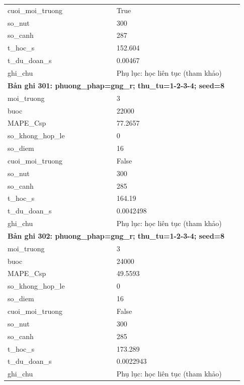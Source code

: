 \begin{longtable}{p{0.43\linewidth}p{0.50\linewidth}}
cuoi\_\allowbreak moi\_\allowbreak truong & True \\
so\_\allowbreak nut & 300 \\
so\_\allowbreak canh & 287 \\
t\_\allowbreak hoc\_\allowbreak s & 152.604 \\
t\_\allowbreak du\_\allowbreak doan\_\allowbreak s & 0.00467 \\
ghi\_\allowbreak chu & Phụ lục: học liên tục (tham khảo) \\
\midrule
\multicolumn{2}{p{0.95\linewidth}}{\textbf{Bản ghi 301: phuong\_phap=gng\_r; thu\_tu=1-2-3-4; seed=8}} \\
moi\_\allowbreak truong & 3 \\
buoc & 22000 \\
MAPE\_\allowbreak Csp & 77.2657 \\
so\_\allowbreak khong\_\allowbreak hop\_\allowbreak le & 0 \\
so\_\allowbreak diem & 16 \\
cuoi\_\allowbreak moi\_\allowbreak truong & False \\
so\_\allowbreak nut & 300 \\
so\_\allowbreak canh & 285 \\
t\_\allowbreak hoc\_\allowbreak s & 164.19 \\
t\_\allowbreak du\_\allowbreak doan\_\allowbreak s & 0.0042498 \\
ghi\_\allowbreak chu & Phụ lục: học liên tục (tham khảo) \\
\midrule
\multicolumn{2}{p{0.95\linewidth}}{\textbf{Bản ghi 302: phuong\_phap=gng\_r; thu\_tu=1-2-3-4; seed=8}} \\
moi\_\allowbreak truong & 3 \\
buoc & 24000 \\
MAPE\_\allowbreak Csp & 49.5593 \\
so\_\allowbreak khong\_\allowbreak hop\_\allowbreak le & 0 \\
so\_\allowbreak diem & 16 \\
cuoi\_\allowbreak moi\_\allowbreak truong & False \\
so\_\allowbreak nut & 300 \\
so\_\allowbreak canh & 285 \\
t\_\allowbreak hoc\_\allowbreak s & 173.289 \\
t\_\allowbreak du\_\allowbreak doan\_\allowbreak s & 0.0022943 \\
ghi\_\allowbreak chu & Phụ lục: học liên tục (tham khảo) \\

\end{longtable}

